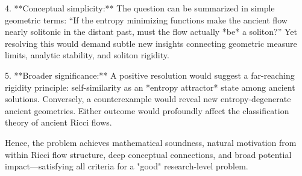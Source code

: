 4. **Conceptual simplicity:**  
   The question can be summarized in simple geometric terms:  
   “If the entropy minimizing functions make the ancient flow nearly solitonic in the distant past, must the flow actually *be* a soliton?”  
   Yet resolving this would demand subtle new insights connecting geometric measure limits, analytic stability, and soliton rigidity.

5. **Broader significance:**  
   A positive resolution would suggest a far-reaching rigidity principle: self-similarity as an *entropy attractor* state among ancient solutions. Conversely, a counterexample would reveal new entropy-degenerate ancient geometries.  
   Either outcome would profoundly affect the classification theory of ancient Ricci flows.

Hence, the problem achieves mathematical soundness, natural motivation from within Ricci flow structure, deep conceptual connections, and broad potential impact—satisfying all criteria for a "good" research-level problem.